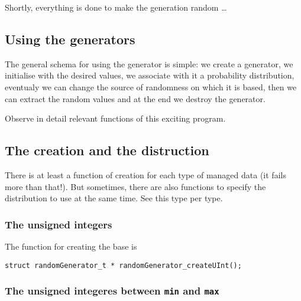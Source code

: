    Shortly, everything is done to make the generation random \ldots


%
\subsection{Using the generators}

  The general schema for using the generator is simple: we create a generator,
we initialise with the desired values, we associate with it a probability 
distribution, eventualy we can change the source of randomness on which it is based,
then we can extract the random values and at the end we destroy the generator.

   Observe in detail relevant functions of this exciting program.

%
\subsection{The creation and the distruction}
   
   There is at least a function of creation for each type of
managed data (it fails more than that!). But sometimes, there are also
functions to specify the distribution to use at the same time. 
See this type per type.

%
\subsubsection{The unsigned integers}

   The function for creating the base is 

\begin{verbatim}
struct randomGenerator_t * randomGenerator_createUInt();
\end{verbatim}

%
\subsubsection{The unsigned integeres between {\tt min} and {\tt max}}

